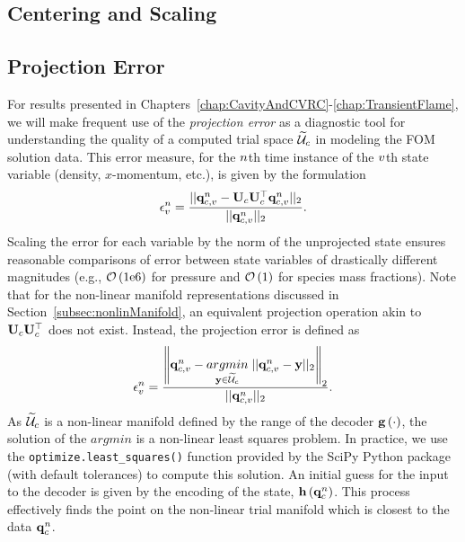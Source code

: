\subsection{Centering and Scaling}\label{subsec:centerScale}


\subsection{Projection Error}\label{subsec:projError}

For results presented in Chapters~\ref{chap:CavityAndCVRC}-\ref{chap:TransientFlame}, we will make frequent use of the \textit{projection error} as a diagnostic tool for understanding the quality of a computed trial space $\consTrialSpace$ in modeling the FOM solution data. This error measure, for the $n$th time instance of the $v$th state variable (density, $x$-momentum, etc.), is given by the formulation
%
\begin{equation}
    \errVecVar^\timeIdx = \frac{|| \consVecVar^\timeIdx - \consTrial \consTrial^\top \consVecVar^\timeIdx ||_2}{|| \consVecVar^\timeIdx ||_2}.
\end{equation}
%
Scaling the error for each variable by the norm of the unprojected state ensures reasonable comparisons of error between state variables of drastically different magnitudes (e.g., $\mathcal{O}\left(1\text{e}6\right)$ for pressure and $\mathcal{O}\left(1\right)$ for species mass fractions). Note that for the non-linear manifold representations discussed in Section~\ref{subsec:nonlinManifold}, an equivalent projection operation akin to $\consTrial \consTrial^\top$ does not exist. Instead, the projection error is defined as
%
\begin{equation}
    \errVecVar^\timeIdx = \frac{\left\Vert \consVecVar^\timeIdx - \argmin{\dummyVec \in \consTrialSpace} ||\consVecVar^\timeIdx - \dummyVec||_2 \right\Vert_2}{|| \consVecVar^\timeIdx ||_2}.
\end{equation}
%
As $\consTrialSpace$ is a non-linear manifold defined by the range of the decoder $\mathbf{g} \left(\cdot\right)$, the solution of the $argmin$ is a non-linear least squares problem. In practice, we use the \verb|optimize.least_squares()| function provided by the SciPy Python package (with default tolerances) to compute this solution. An initial guess for the input to the decoder is given by the encoding of the state, $\mathbf{h} \left(\mathbf{q}_c^{n}\right)$. This process effectively finds the point on the non-linear trial manifold which is closest to the data $\mathbf{q}_c^{n}$.

